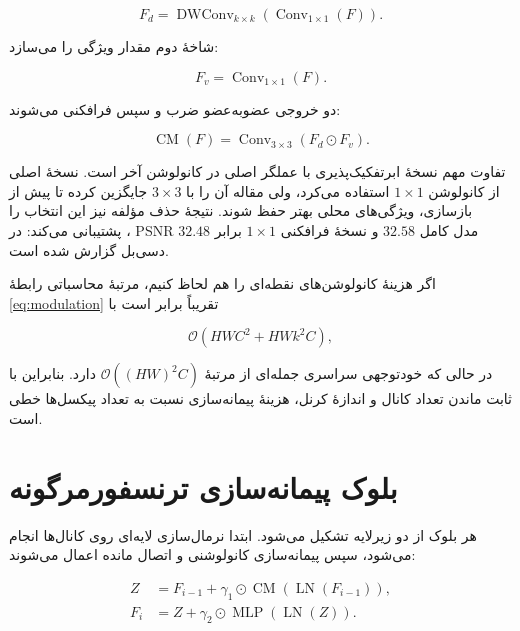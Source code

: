 \begin{equation}
F_{d}=\operatorname{DWConv}_{k\times k}\!\left(\operatorname{Conv}_{1\times1}(F)\right).
\end{equation}

شاخهٔ دوم مقدار ویژگی را می‌سازد:

\begin{equation}
F_{v}=\operatorname{Conv}_{1\times1}(F).
\end{equation}

دو خروجی عضو‌به‌عضو ضرب و سپس فرافکنی می‌شوند:

\begin{equation}
\operatorname{CM}(F)=\operatorname{Conv}_{3\times3}(F_{d}\odot F_{v}).
\label{eq:modulation}
\end{equation}

تفاوت مهم نسخهٔ ابرتفکیک‌پذیری با عملگر اصلی  در کانولوشن آخر است. نسخهٔ اصلی از کانولوشن $1\times1$ استفاده می‌کرد، ولی مقاله آن را با $3\times3$ جایگزین کرده تا پیش از بازسازی، ویژگی‌های محلی بهتر حفظ شوند. نتیجهٔ حذف مؤلفه نیز این انتخاب را پشتیبانی می‌کند: در ، PSNR مدل کامل $32.58$ و نسخهٔ فرافکنی $1\times1$ برابر $32.48$ دسی‌بل گزارش شده است.

اگر هزینهٔ کانولوشن‌های نقطه‌ای را هم لحاظ کنیم، مرتبهٔ محاسباتی رابطهٔ \ref{eq:modulation} تقریباً برابر است با

\begin{equation}
\mathcal{O}\!\left(HWC^2 + HWk^2C\right),
\end{equation}

در حالی که خودتوجهی سراسری جمله‌ای از مرتبهٔ
$\mathcal{O}((HW)^2C)$ دارد. بنابراین با ثابت ماندن تعداد کانال و اندازهٔ کرنل، هزینهٔ پیمانه‌سازی نسبت به تعداد پیکسل‌ها خطی است.

\section{بلوک پیمانه‌سازی ترنسفورمرگونه}

هر بلوک از دو زیرلایه تشکیل می‌شود. ابتدا نرمال‌سازی لایه‌ای روی کانال‌ها انجام می‌شود، سپس پیمانه‌سازی کانولوشنی و اتصال مانده اعمال می‌شوند:

\begin{align}
Z &= F_{i-1} + \gamma_1\odot
\operatorname{CM}\!\left(\operatorname{LN}(F_{i-1})\right),\\
F_i &= Z + \gamma_2\odot
\operatorname{MLP}\!\left(\operatorname{LN}(Z)\right).
\label{eq:block}
\end{align}

